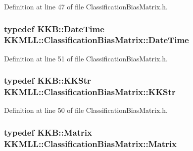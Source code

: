 Definition at line 47 of file Classification\+Bias\+Matrix.\+h.

\subsubsection[{\texorpdfstring{Date\+Time}{DateTime}}]{\setlength{\rightskip}{0pt plus 5cm}typedef {\bf K\+K\+B\+::\+Date\+Time} {\bf K\+K\+M\+L\+L\+::\+Classification\+Bias\+Matrix\+::\+Date\+Time}}\hypertarget{class_k_k_m_l_l_1_1_classification_bias_matrix_a572e2991c935f630d576a87a5302f640}{}\label{class_k_k_m_l_l_1_1_classification_bias_matrix_a572e2991c935f630d576a87a5302f640}


Definition at line 51 of file Classification\+Bias\+Matrix.\+h.

\subsubsection[{\texorpdfstring{K\+K\+Str}{KKStr}}]{\setlength{\rightskip}{0pt plus 5cm}typedef {\bf K\+K\+B\+::\+K\+K\+Str} {\bf K\+K\+M\+L\+L\+::\+Classification\+Bias\+Matrix\+::\+K\+K\+Str}}\hypertarget{class_k_k_m_l_l_1_1_classification_bias_matrix_a80f330b2f5e53d06e2a347b5e16f9f86}{}\label{class_k_k_m_l_l_1_1_classification_bias_matrix_a80f330b2f5e53d06e2a347b5e16f9f86}


Definition at line 50 of file Classification\+Bias\+Matrix.\+h.

\subsubsection[{\texorpdfstring{Matrix}{Matrix}}]{\setlength{\rightskip}{0pt plus 5cm}typedef {\bf K\+K\+B\+::\+Matrix} {\bf K\+K\+M\+L\+L\+::\+Classification\+Bias\+Matrix\+::\+Matrix}}\hypertarget{class_k_k_m_l_l_1_1_classification_bias_matrix_aa42a3655845e9f5e464b49b044cdb11c}{}\label{class_k_k_m_l_l_1_1_classification_bias_matrix_aa42a3655845e9f5e464b49b044cdb11c}



